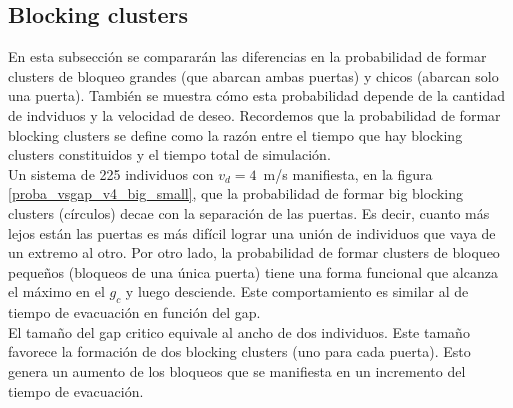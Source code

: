 

\subsection{Blocking clusters}

En esta subsección se compararán las diferencias en la probabilidad de formar clusters de bloqueo grandes (que abarcan ambas puertas) y chicos (abarcan solo una puerta). También se muestra cómo esta probabilidad depende de la cantidad de indviduos y la velocidad de deseo. Recordemos que la probabilidad de formar blocking clusters se define como la razón entre el tiempo que hay blocking clusters constituidos y el tiempo total de simulación. \\

Un sistema de 225 individuos con $v_d=4$~m/s manifiesta, en la figura \ref{proba_vsgap_v4_big_small}, que la probabilidad de formar big blocking clusters (círculos) decae con la separación de las puertas. Es decir, cuanto más lejos están las puertas es más difícil lograr una unión de individuos que vaya de un extremo al otro.
Por otro lado, la probabilidad de formar clusters de bloqueo pequeños (bloqueos de una única puerta) tiene una forma funcional que alcanza el máximo en el $g_c$ y luego desciende. Este comportamiento es similar al de tiempo de evacuación en función del gap.\\

El tamaño del gap critico equivale al ancho de dos individuos. Este tamaño favorece la formación de dos blocking clusters (uno para cada puerta). Esto genera un aumento de los bloqueos que se manifiesta en un incremento del tiempo de evacuación. 


